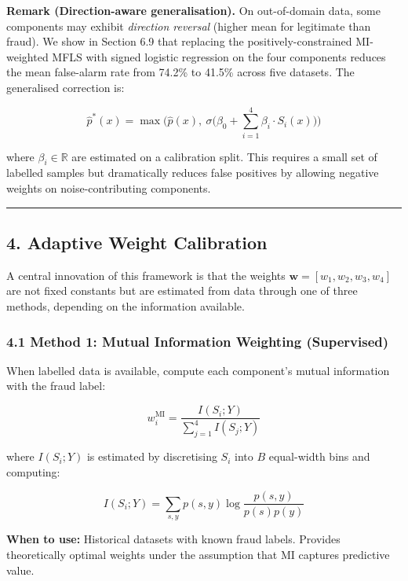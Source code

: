 \documentclass[
  11pt,
]{article}
\begin{document}
\textbf{Remark (Direction-aware generalisation).} On out-of-domain data,
some components may exhibit \emph{direction reversal} (higher mean for
legitimate than fraud). We show in Section 6.9 that replacing the
positively-constrained MI-weighted MFLS with signed logistic regression
on the four components reduces the mean false-alarm rate from 74.2\% to
41.5\% across five datasets. The generalised correction is:

\[\hat{p}^*(x) = \max\!\Big(\hat{p}(x),\ \sigma\!\Big(\beta_0 + \sum_{i=1}^{4} \beta_i \cdot S_i(x)\Big)\!\Big)\]

where \(\beta_i \in \mathbb{R}\) are estimated on a calibration split.
This requires a small set of labelled samples but dramatically reduces
false positives by allowing negative weights on noise-contributing
components.

\begin{center}\rule{0.5\linewidth}{0.5pt}\end{center}

\subsection{4. Adaptive Weight
Calibration}\label{adaptive-weight-calibration}

A central innovation of this framework is that the weights
\(\mathbf{w} = [w_1, w_2, w_3, w_4]\) are not fixed constants but are
estimated from data through one of three methods, depending on the
information available.

\subsubsection{4.1 Method 1: Mutual Information Weighting
(Supervised)}\label{method-1-mutual-information-weighting-supervised}

When labelled data is available, compute each component’s mutual
information with the fraud label:

\[w_i^{\text{MI}} = \frac{I(S_i; Y)}{\sum_{j=1}^{4} I(S_j; Y)}\]

where \(I(S_i; Y)\) is estimated by discretising \(S_i\) into \(B\)
equal-width bins and computing:

\[I(S_i; Y) = \sum_{s, y} p(s, y) \log \frac{p(s, y)}{p(s) p(y)}\]

\textbf{When to use:} Historical datasets with known fraud labels.
Provides theoretically optimal weights under the assumption that MI
captures predictive value.
\end{document}
